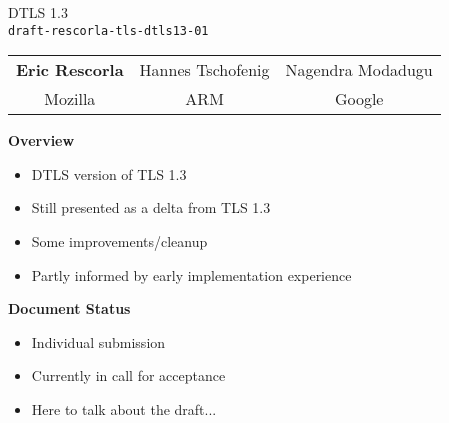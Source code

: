 \documentclass[helvetica]{seminar}
\newcommand{\heading}[1]{%
  \begin{center} 
    \large\bf 
    #1 
  \end{center} 
  \vspace{.4 in}}
\begin{document}
\begin{slide}
\begin{center}
\vspace{.5 in}
\LARGE{{\bf}DTLS 1.3\\{\small \verb^draft-rescorla-tls-dtls13-01^}}\\
\vspace{.2in}
\large{
\begin{tabular}{c c c}
\textbf{Eric Rescorla} & Hannes Tschofenig & Nagendra Modadugu \\
Mozilla & ARM & Google \\
\end{tabular}
}
\end{center}
\end{slide}

\centerslidesfalse 

\begin{slide}
\heading{Overview}

\begin{itemize}
\item DTLS version of TLS 1.3
\item Still presented as a delta from TLS 1.3
\item Some improvements/cleanup
\item Partly informed by early implementation experience
\end{itemize}

\end{slide}

\begin{slide}
\heading{Document Status}

\begin{itemize}
\item Individual submission
\item Currently in call for acceptance
\item Here to talk about the draft...  
\end{itemize}
\end{slide}
\end{document}
